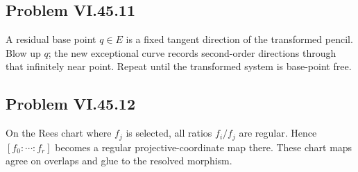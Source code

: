 \subsection*{Problem VI.45.11}
\begin{solution}
A residual base point \(q\in E\) is a fixed tangent direction of the transformed pencil.  Blow up \(q\); the new exceptional curve records second-order directions through that infinitely near point.  Repeat until the transformed system is base-point free.
\end{solution}

\subsection*{Problem VI.45.12}
\begin{solution}
On the Rees chart where \(f_j\) is selected, all ratios \(f_i/f_j\) are regular.  Hence \([f_0:\cdots:f_r]\) becomes a regular projective-coordinate map there.  These chart maps agree on overlaps and glue to the resolved morphism.
\end{solution}

